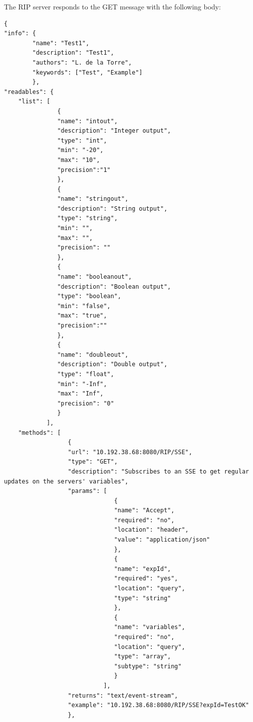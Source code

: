 The RIP server responds to the GET message with the following body:

\begin{lstlisting}
{
"info": {
        "name": "Test1",
        "description": "Test1",
        "authors": "L. de la Torre",
        "keywords": ["Test", "Example"]
        },
"readables": {
    "list": [
               {
               "name": "intout",
               "description": "Integer output",
               "type": "int",
               "min": "-20",
               "max": "10",
               "precision":"1"
               },
               {
               "name": "stringout",
               "description": "String output",
               "type": "string",
               "min": "",
               "max": "",
               "precision": ""
               },
               {
               "name": "booleanout",
               "description": "Boolean output",
               "type": "boolean",
               "min": "false",
               "max": "true",
               "precision":""
               },
               {
               "name": "doubleout",
               "description": "Double output",
               "type": "float",
               "min": "-Inf",
               "max": "Inf",
               "precision": "0"
               }
            ],
    "methods": [  
                  {
                  "url": "10.192.38.68:8080/RIP/SSE",
                  "type": "GET",
                  "description": "Subscribes to an SSE to get regular updates on the servers' variables",
                  "params": [
                               {
                               "name": "Accept",
                               "required": "no",
                               "location": "header",
                               "value": "application/json"
                               },
                               {
                               "name": "expId",
                               "required": "yes",
                               "location": "query",
                               "type": "string"
                               },
                               {
                               "name": "variables",
                               "required": "no",
                               "location": "query",
                               "type": "array",
                               "subtype": "string"
                               }
                            ],
                  "returns": "text/event-stream",
                  "example": "10.192.38.68:8080/RIP/SSE?expId=TestOK"
                  },

\end{lstlisting}
